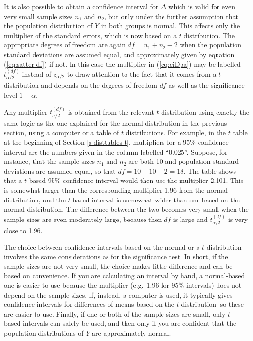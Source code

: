\documentclass[11pt,a4paper,openany]{book}
\begin{document}
It is also possible to obtain a confidence interval for \(\Delta\) which
is valid for even very small sample sizes \(n_{1}\) and \(n_{2}\), but
only under the further assumption that the population distribution of
\(Y\) in both groups is normal. This affects only the multiplier of the
standard errors, which is now based on a \(t\) distribution. The
appropriate degrees of freedom are again \(df=n_{1}+n_{2}-2\) when the
population standard deviations are assumed equal, and approximately
given by equation (\ref{eq:satter-df}) if not. In this case the
multiplier in (\ref{eq:ciDpa}) may be labelled \(t^{(df)}_{\alpha/2}\)
instead of \(z_{\alpha/2}\) to draw attention to the fact that it comes
from a \(t\)-distribution and depends on the degrees of freedom \(df\)
as well as the significance level \(1-\alpha\).

Any multiplier \(t_{\alpha/2}^{(df)}\) is obtained from the relevant
\(t\) distribution using exactly the same logic as the one explained for
the normal distribution in the previous section, using a computer or a
table of \(t\) distributions. For example, in the \(t\) table at the
beginning of Section \ref{s-disttables-t}, multipliers for a 95\%
confidence interval are the numbers given in the column labelled
``0.025''. Suppose, for instance, that the sample sizes \(n_{1}\) and
\(n_{2}\) are both 10 and population standard deviations are assumed
equal, so that \(df=10+10-2=18\). The table shows that a \(t\)-based
95\% confidence interval would then use the multiplier 2.101. This is
somewhat larger than the corresponding multiplier 1.96 from the normal
distribution, and the \(t\)-based interval is somewhat wider than one
based on the normal distribution. The difference between the two becomes
very small when the sample sizes are even moderately large, because then
\(df\) is large and \(t_{\alpha/2}^{(df)}\) is very close to 1.96.

The choice between confidence intervals based on the normal or a \(t\)
distribution involves the same considerations as for the significance
test. In short, if the sample sizes are not very small, the choice makes
little difference and can be based on convenience. If you are
calculating an interval by hand, a normal-based one is easier to use
because the multiplier (e.g.~1.96 for 95\% intervals) does not depend on
the sample sizes. If, instead, a computer is used, it typically gives
confidence intervals for differences of means based on the \(t\)
distribution, so these are easier to use. Finally, if one or both of the
sample sizes are small, only \(t\)-based intervals can safely be used,
and then only if you are confident that the population distributions of
\(Y\) are approximately normal.
\end{document}
